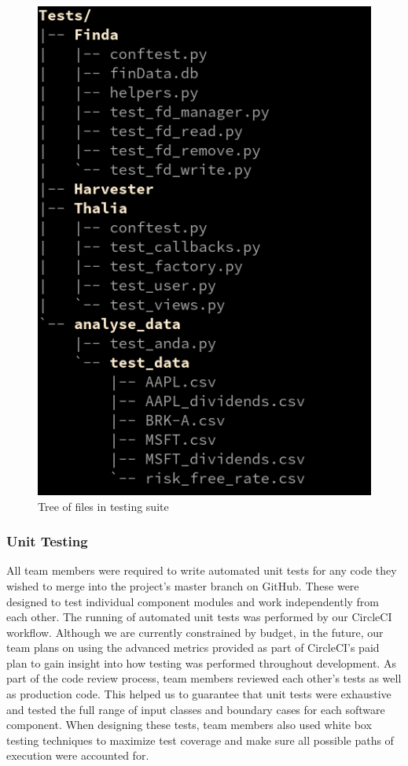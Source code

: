 \documentclass[main.tex]{subfiles}
\begin{document}
\begin{figure}[H]
   \centering
   \includegraphics[scale=0.3]{07Testing/06Pictures/testingSuiteStructure.png}
   \caption{Tree of files in testing suite}
   \label{Testing Suite}
\end{figure}

\subsubsection{Unit Testing}
All team members were required to write automated unit tests for any code they wished to merge into the project’s master branch on GitHub. These were designed to test individual component modules and work independently from each other. The running of automated unit tests was performed by our CircleCI workflow. Although we are currently constrained by budget, in the future, our team plans on using the advanced metrics provided as part of CircleCI's paid plan to gain insight into how testing was performed throughout development. As part of the code review process, team members reviewed each other's tests as well as production code. This helped us to guarantee that unit tests were exhaustive and tested the full range of input classes and boundary cases for each software component. When designing these tests, team members also used white box testing techniques to maximize test coverage and make sure all possible paths of execution were accounted for.
\end{document}
